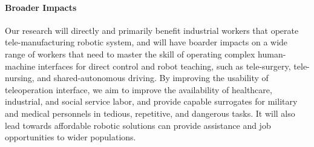 


\vspace{0.5 em}

\paragraph*{\Large Broader Impacts}
Our research will directly and primarily benefit industrial workers that operate tele-manufacturing robotic system, and will have boarder impacts on a wide range of workers that need to master the skill of operating complex human-machine interfaces for direct control and robot teaching, such as tele-surgery, tele-nursing, and shared-autonomous driving. By improving the usability of teleoperation interface, we aim to improve the availability of healthcare, industrial, and social service labor, and provide capable surrogates for military and medical personnels in tedious, repetitive, and dangerous tasks. It will also lead towards affordable robotic solutions can provide assistance and job opportunities to wider populations. 

